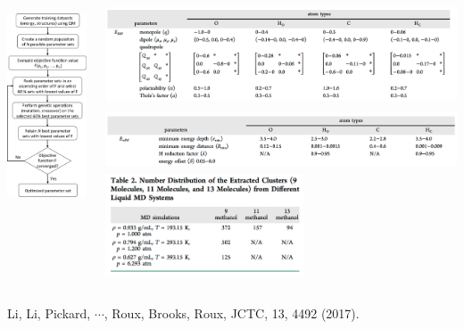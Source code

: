 \documentclass[handout]{beamer} %
\begin{document}
\begin{frame}
\vspace{-8mm} 
\begin{columns}
\begin{column}{0.3\textwidth}
\begin{center}
\includegraphics[height=2.4in]{figures_ml/Roux_flow.png}
\end{center}
\end{column}
\begin{column}{0.7\textwidth}
\begin{center}
\includegraphics[height=1.2in]{figures_ml/Roux_parameters1.png} \\
\includegraphics[height=0.7in]{figures_ml/Roux_parameters2.png} \\
\includegraphics[height=1.2in]{figures_ml/Roux_training_set.png}
\end{center}
\end{column}
\end{columns}
\begin{center}
\scriptsize{Li, Li, Pickard, $\cdots$, Roux, Brooks, Roux, JCTC, 13, 4492 (2017).}
\end{center} 
\end{frame}
\end{document}
